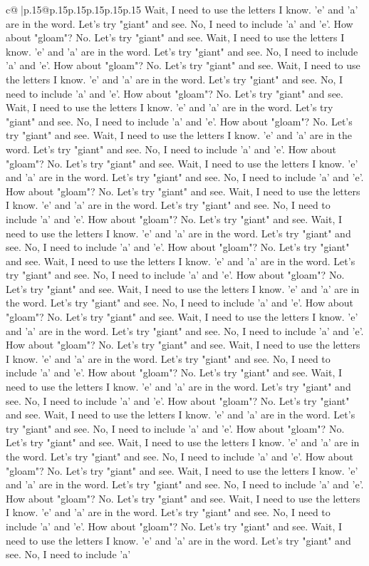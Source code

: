 \documentclass{article}
\begin{document}
{\begin{supertabular}{c@{$\;$}|p{.15\linewidth}@{}p{.15\linewidth}p{.15\linewidth}p{.15\linewidth}p{.15\linewidth}p{.15\linewidth}}
{{{Wait, I need to use the letters I know. 'e' and 'a' are in the word. Let's try "giant" and see. No, I need to include 'a' and 'e'. How about "gloam"? No. Let's try "giant" and see. Wait, I need to use the letters I know. 'e' and 'a' are in the word. Let's try "giant" and see. No, I need to include 'a' and 'e'. How about "gloam"? No. Let's try "giant" and see. Wait, I need to use the letters I know. 'e' and 'a' are in the word. Let's try "giant" and see. No, I need to include 'a' and 'e'. How about "gloam"? No. Let's try "giant" and see. Wait, I need to use the letters I know. 'e' and 'a' are in the word. Let's try "giant" and see. No, I need to include 'a' and 'e'. How about "gloam"? No. Let's try "giant" and see. Wait, I need to use the letters I know. 'e' and 'a' are in the word. Let's try "giant" and see. No, I need to include 'a' and 'e'. How about "gloam"? No. Let's try "giant" and see. Wait, I need to use the letters I know. 'e' and 'a' are in the word. Let's try "giant" and see. No, I need to include 'a' and 'e'. How about "gloam"? No. Let's try "giant" and see. Wait, I need to use the letters I know. 'e' and 'a' are in the word. Let's try "giant" and see. No, I need to include 'a' and 'e'. How about "gloam"? No. Let's try "giant" and see. Wait, I need to use the letters I know. 'e' and 'a' are in the word. Let's try "giant" and see. No, I need to include 'a' and 'e'. How about "gloam"? No. Let's try "giant" and see. Wait, I need to use the letters I know. 'e' and 'a' are in the word. Let's try "giant" and see. No, I need to include 'a' and 'e'. How about "gloam"? No. Let's try "giant" and see. Wait, I need to use the letters I know. 'e' and 'a' are in the word. Let's try "giant" and see. No, I need to include 'a' and 'e'. How about "gloam"? No. Let's try "giant" and see. Wait, I need to use the letters I know. 'e' and 'a' are in the word. Let's try "giant" and see. No, I need to include 'a' and 'e'. How about "gloam"? No. Let's try "giant" and see. Wait, I need to use the letters I know. 'e' and 'a' are in the word. Let's try "giant" and see. No, I need to include 'a' and 'e'. How about "gloam"? No. Let's try "giant" and see. Wait, I need to use the letters I know. 'e' and 'a' are in the word. Let's try "giant" and see. No, I need to include 'a' and 'e'. How about "gloam"? No. Let's try "giant" and see. Wait, I need to use the letters I know. 'e' and 'a' are in the word. Let's try "giant" and see. No, I need to include 'a' and 'e'. How about "gloam"? No. Let's try "giant" and see. Wait, I need to use the letters I know. 'e' and 'a' are in the word. Let's try "giant" and see. No, I need to include 'a' and 'e'. How about "gloam"? No. Let's try "giant" and see. Wait, I need to use the letters I know. 'e' and 'a' are in the word. Let's try "giant" and see. No, I need to include 'a' and 'e'. How about "gloam"? No. Let's try "giant" and see. Wait, I need to use the letters I know. 'e' and 'a' are in the word. Let's try "giant" and see. No, I need to include 'a' and 'e'. How about "gloam"? No. Let's try "giant" and see. Wait, I need to use the letters I know. 'e' and 'a' are in the word. Let's try "giant" and see. No, I need to include 'a' }}}
\end{supertabular}}
\end{document}
